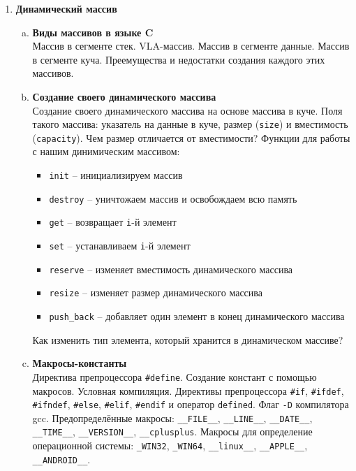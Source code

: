 \documentclass{article}
\begin{document}
\begin{enumerate}
\item \textbf{Динамический массив}\\

\begin{enumerate}[a.]
\item \textbf{Виды массивов в языке C}\\
Массив в сегменте стек. VLA-массив. Массив в сегменте данные. Массив в сегменте куча. Преемущества и недостатки создания каждого этих массивов.

\item \textbf{Создание своего динамического массива}\\
Создание своего динамического массива на основе массива в куче. Поля такого массива: указатель на данные в куче, размер (\texttt{size}) и вместимость (\texttt{capacity}). Чем размер отличается от вместимости? Функции для работы с нашим динимическим массивом:
\begin{itemize}
\item \texttt{init} -- инициализируем массив
\item \texttt{destroy} -- уничтожаем массив и освобождаем всю память
\item \texttt{get} -- возвращает \texttt{i}-й элемент
\item \texttt{set} -- устанавливаем \texttt{i}-й элемент
\item \texttt{reserve} -- изменяет вместимость динамического массива
\item \texttt{resize} -- изменяет размер динамического массива
\item \texttt{push\_back} -- добавляет один элемент в конец динамического массива
\end{itemize}
Как изменить тип элемента, который хранится в динамическом массиве?



\item \textbf{Макросы-константы}\\
Директива препроцессора \texttt{\#define}. Создание констант с помощью макросов.
Условная компиляция.  Директивы препроцессора \texttt{\#if}, \texttt{\#ifdef}, \texttt{\#ifndef}, \texttt{\#else}, \texttt{\#elif}, \texttt{\#endif} и оператор \texttt{defined}. Флаг \texttt{-D} компилятора gcc. Предопределённые макросы:
\texttt{\_\_FILE\_\_}, \texttt{\_\_LINE\_\_}, \texttt{\_\_DATE\_\_}, \texttt{\_\_TIME\_\_}, \texttt{\_\_VERSION\_\_}, \texttt{\_\_cplusplus}. Макросы для определение операционной системы: \texttt{\_WIN32}, \texttt{\_WIN64}, \texttt{\_\_linux\_\_}, \texttt{\_\_APPLE\_\_}, \texttt{\_\_ANDROID\_\_}. 


\end{enumerate}
\end{enumerate}
\end{document}
